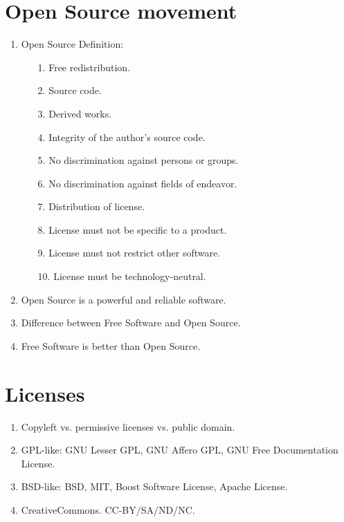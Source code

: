 \documentclass[10pt,a4paper]{article}
\begin{document}
\section{Open Source movement}
\begin{enumerate}
  \item Open Source Definition:
  \begin{enumerate}
    \item[1.] Free redistribution.
    \item[2.] Source code.
    \item[3.] Derived works.
    \item[4.] Integrity of the author's source code.
    \item[5.] No discrimination against persons or groups.
    \item[6.] No discrimination against fields of endeavor.
    \item[7.] Distribution of license.
    \item[8.] License must not be specific to a product.
    \item[9.] License must not restrict other software.
    \item[10.] License must be technology-neutral.
  \end{enumerate}
  \item Open Source is a powerful and reliable software.
  \item Difference between Free Software and Open Source.
  \item Free Software is better than Open Source.
\end{enumerate}

\section{Licenses}
\begin{enumerate}
  \item Copyleft vs. permissive licenses vs. public domain.
  \item GPL-like: GNU Lesser GPL, GNU Affero GPL, GNU Free Documentation License.
  \item BSD-like: BSD, MIT, Boost Software License, Apache License.
  \item CreativeCommons. CC-BY/SA/ND/NC.
\end{enumerate}
\end{document}
